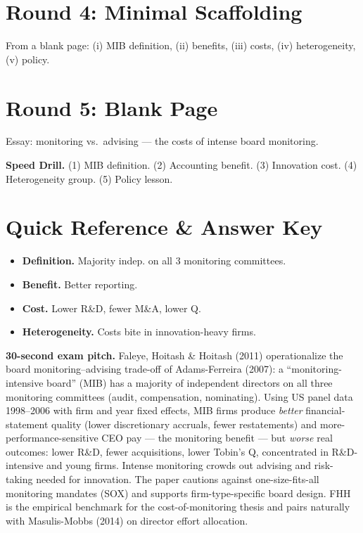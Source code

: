 \documentclass[11pt]{article}
\begin{document}
\section*{Round 4: Minimal Scaffolding}
From a blank page: (i) MIB definition, (ii) benefits, (iii) costs, (iv) heterogeneity, (v) policy.

\section*{Round 5: Blank Page}
Essay: monitoring vs.\ advising --- the costs of intense board monitoring.

\vspace{6pt}
\begin{drillbox}
\textbf{Speed Drill.} (1) MIB definition. (2) Accounting benefit. (3) Innovation cost. (4) Heterogeneity group. (5) Policy lesson.
\end{drillbox}

\section*{Quick Reference \& Answer Key}
\begin{answerbox}
\begin{itemize}
\item \textbf{Definition.} Majority indep. on all 3 monitoring committees.
\item \textbf{Benefit.} Better reporting.
\item \textbf{Cost.} Lower R\&D, fewer M\&A, lower Q.
\item \textbf{Heterogeneity.} Costs bite in innovation-heavy firms.
\end{itemize}
\end{answerbox}

\begin{keybox}
\textbf{30-second exam pitch.} Faleye, Hoitash \& Hoitash (2011) operationalize the board monitoring--advising trade-off of Adams-Ferreira (2007): a ``monitoring-intensive board'' (MIB) has a majority of independent directors on all three monitoring committees (audit, compensation, nominating). Using US panel data 1998--2006 with firm and year fixed effects, MIB firms produce \emph{better} financial-statement quality (lower discretionary accruals, fewer restatements) and more-performance-sensitive CEO pay --- the monitoring benefit --- but \emph{worse} real outcomes: lower R\&D, fewer acquisitions, lower Tobin's Q, concentrated in R\&D-intensive and young firms. Intense monitoring crowds out advising and risk-taking needed for innovation. The paper cautions against one-size-fits-all monitoring mandates (SOX) and supports firm-type-specific board design. FHH is the empirical benchmark for the cost-of-monitoring thesis and pairs naturally with Masulis-Mobbs (2014) on director effort allocation.
\end{keybox}
\end{document}
